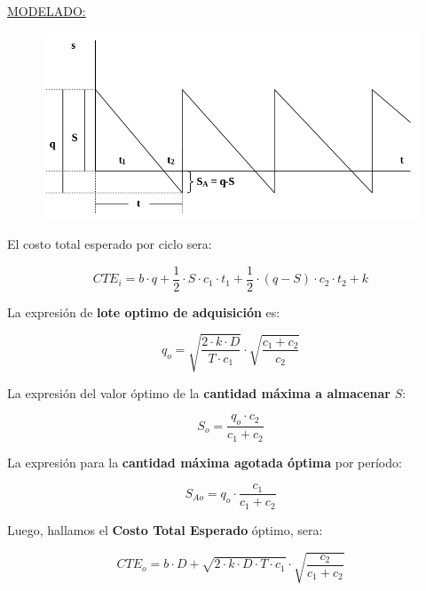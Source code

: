 \documentclass{article}
\begin{document}
\noindent
\underline{MODELADO:}

\begin{figure}[h!]
    \includegraphics[width=\linewidth]{imagenes/stock-modelo-agotamiento.png}
\end{figure}

El costo total esperado por ciclo sera:

\begin{equation}
    CTE_i= b \cdot q + \frac{1}{2} \cdot S \cdot c_1 \cdot t_1 + \frac{1}{2} \cdot (q - S) \cdot c_2 \cdot t_2 + k
\end{equation}

La expresión de \textbf{lote optimo de adquisición} es:

\begin{equation}
    q_o = \sqrt{\frac{2 \cdot k \cdot D}{T \cdot c_1}} \cdot \sqrt{\frac{c_1+c_2}{c_2}}
\end{equation}

La expresión del valor óptimo de la \textbf{cantidad máxima a almacenar} \(S\):

\begin{equation}
    S_o = \frac{q_o \cdot c_2}{c_1 + c_2}
\end{equation}

La expresión para la \textbf{cantidad máxima agotada óptima} por período:

\begin{equation}
    S_{Ao} = q_o \cdot \frac{c_1}{c_1 + c_2}
\end{equation}

Luego, hallamos el \textbf{Costo Total Esperado} óptimo, sera:

\begin{equation}
    CTE_o = b \cdot D + \sqrt{2 \cdot k \cdot D \cdot T \cdot c_1} \cdot \sqrt{\frac{c_2}{c_1 + c_2}}
\end{equation}
\end{document}
